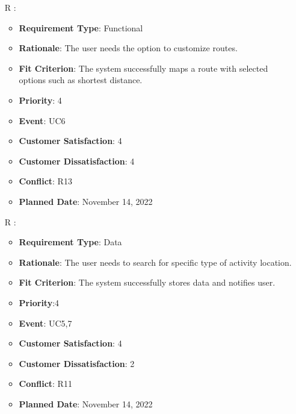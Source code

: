 \documentclass[12pt, titlepage]{article}
\newcounter{reqnum} %
\begin{document}
\begin{itemize}
\item[R\refstepcounter{reqnum}\thereqnum
\label{R_Inputs_1}:] 
\begin{itemize}
    \item \textbf{Requirement Type}: Functional
    \item \textbf{Rationale}: The user needs the option to customize routes. 
    \item \textbf{Fit Criterion}: The system successfully maps a route with selected options such as shortest distance. 
    \item \textbf{Priority}: 4
    \item \textbf{Event}: UC6
    \item \textbf{Customer Satisfaction}: 4
    \item \textbf{Customer Dissatisfaction}: 4
    \item \textbf{Conflict}: R13
    \item \textbf{Planned Date}: November 14, 2022
\end{itemize}

\item[R\refstepcounter{reqnum}\thereqnum
\label{R_Inputs_1}:] 
\begin{itemize}
    \item \textbf{Requirement Type}: Data
    \item \textbf{Rationale}: The user needs to search for specific type of activity location.
    \item \textbf{Fit Criterion}: The system successfully stores data and notifies user. 
    \item \textbf{Priority}:4
    \item \textbf{Event}: UC5,7
    \item \textbf{Customer Satisfaction}: 4
    \item \textbf{Customer Dissatisfaction}: 2
    \item \textbf{Conflict}: R11
    \item \textbf{Planned Date}: November 14, 2022
\end{itemize}


\end{itemize}
\end{document}
